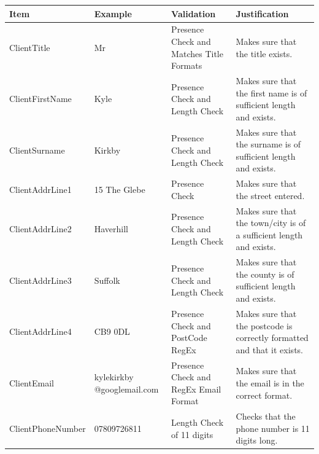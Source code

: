 \begin{longtable}{|p{3cm}|p{3cm}|p{3cm}|p{3cm}|}
\hline \textbf{Item} & \textbf{Example} & \textbf{Validation} &\textbf{Justification} \\ \hline
ClientTitle & Mr & Presence Check and Matches Title Formats  & Makes sure that the title exists. \\ \hline
ClientFirstName & Kyle & Presence Check and Length Check & Makes sure that the first name is of sufficient length and exists. \\ \hline
ClientSurname & Kirkby & Presence Check and Length Check & Makes sure that the surname is of sufficient length and exists. \\ \hline
ClientAddrLine1 & 15 The Glebe & Presence Check & Makes sure that the street entered. \\ \hline
ClientAddrLine2 & Haverhill & Presence Check and Length Check & Makes sure that the town/city is of a sufficient length and exists. \\ \hline
ClientAddrLine3 & Suffolk & Presence Check and Length Check & Makes sure that the county is of sufficient length and exists. \\ \hline
ClientAddrLine4 & CB9 0DL & Presence Check and PostCode RegEx & Makes sure that the postcode is correctly formatted and that it exists. \\ \hline
ClientEmail & kylekirkby @googlemail.com & Presence Check and RegEx Email Format & Makes sure that the email is in the correct format. \\ \hline
ClientPhoneNumber & 07809726811 & Length Check of 11 digits & Checks that the phone number is 11 digits long. \\ \hline \hline



\end{longtable}
